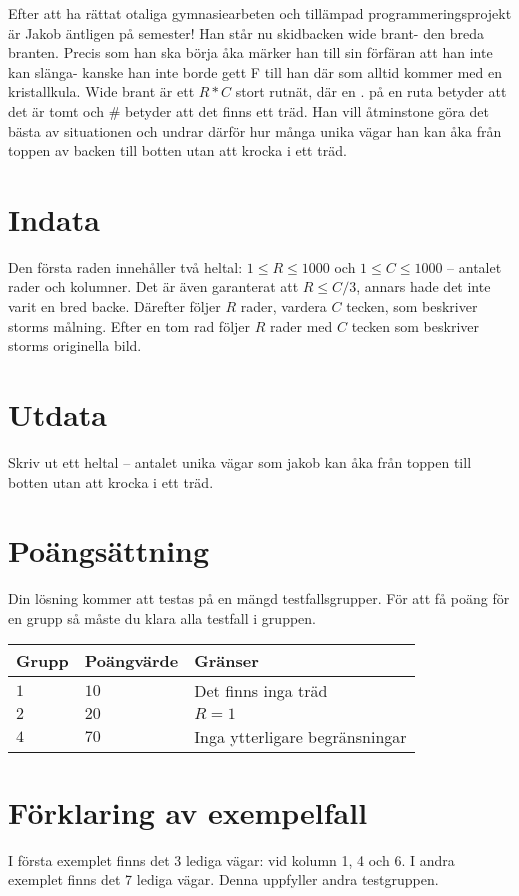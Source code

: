 Efter att ha rättat otaliga gymnasiearbeten och tillämpad programmeringsprojekt är Jakob äntligen på semester! Han står nu skidbacken wide brant- den breda branten.
Precis som han ska börja åka märker han till sin förfäran att han inte kan slänga- kanske han inte borde gett F till han där som alltid kommer med en kristallkula.
Wide brant är ett $R*C$ stort rutnät, där en . på en ruta betyder att det är tomt och \# betyder att det finns ett träd. 
Han vill åtminstone göra det bästa av situationen och undrar därför hur många unika vägar han kan åka från toppen av backen till botten utan att krocka i ett träd.

\section*{Indata}
Den första raden innehåller två heltal: $1\leq R \leq 1000$ och $1 \leq C \leq 1000$ -- antalet rader och kolumner. Det är även garanterat att $R \leq C/3$, annars hade det inte varit en bred backe.
Därefter följer $R$ rader, vardera $C$ tecken, som beskriver storms målning. 
Efter en tom rad följer $R$ rader med $C$ tecken som beskriver storms originella bild. 

\section*{Utdata}
Skriv ut ett heltal -- antalet unika vägar som jakob kan åka från toppen till botten utan att krocka i ett träd.

\section*{Poängsättning}
Din lösning kommer att testas på en mängd testfallsgrupper.
För att få poäng för en grupp så måste du klara alla testfall i gruppen.

\noindent
\begin{tabular}{| l | l | p{12cm} |}
  \hline
  Grupp & Poängvärde & Gränser \\ \hline
  $1$   & $10$       & Det finns inga träd \\ \hline
  $2$   & $20$       & $R=1$ \\ \hline
  $4$   & $70$       & Inga ytterligare begränsningar  \\ \hline
\end{tabular}

\section*{Förklaring av exempelfall}
I första exemplet finns det 3 lediga vägar: vid kolumn 1, 4 och 6.
I andra exemplet finns det 7 lediga vägar. Denna uppfyller andra testgruppen.